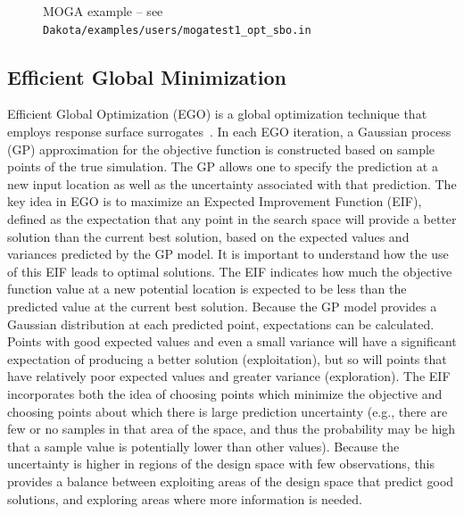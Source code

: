 \begin{figure}
  \begin{bigbox}
    \begin{scriptsize}
    \end{scriptsize}
  \end{bigbox}
  \caption{MOGA example -- 
see \texttt{Dakota/examples/users/mogatest1\_opt\_sbo.in} }
  \label{sbm:sbgm_moga}
\end{figure}
 
\subsection{Efficient Global Minimization}\label{adv_meth:sbm:egm}

Efficient Global Optimization (EGO) is a global optimization technique
that employs response surface surrogates~\cite{Jon98,Hua06}.  In each
EGO iteration, a Gaussian process (GP) approximation for the objective
function is constructed based on sample points of the true simulation.
The GP allows one to specify the prediction at a new input location as
well as the uncertainty associated with that prediction.  The key idea
in EGO is to maximize an Expected Improvement Function (EIF), defined
as the expectation that any point in the search space will provide a
better solution than the current best solution, based on the expected
values and variances predicted by the GP model.  It is important to
understand how the use of this EIF leads to optimal solutions.  The
EIF indicates how much the objective function value at a new potential
location is expected to be less than the predicted value at the
current best solution.  Because the GP model provides a Gaussian
distribution at each predicted point, expectations can be calculated.
Points with good expected values and even a small variance will have a
significant expectation of producing a better solution (exploitation),
but so will points that have relatively poor expected values and
greater variance (exploration).  The EIF incorporates both the idea of
choosing points which minimize the objective and choosing points about
which there is large prediction uncertainty (e.g., there are few or no
samples in that area of the space, and thus the probability may be
high that a sample value is potentially lower than other values).
Because the uncertainty is higher in regions of the design space with
few observations, this provides a balance between exploiting areas of
the design space that predict good solutions, and exploring areas
where more information is needed.


